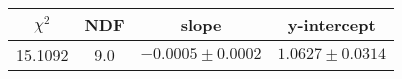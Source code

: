 \begin{tabular}{|c|c|c|c|}

\hline
$\chi^{2}$ & NDF & slope & y-intercept  \\
\hline
15.1092 & 9.0 & $-0.0005\pm0.0002$ & $1.0627\pm0.0314$ \\
\hline

\end{tabular}